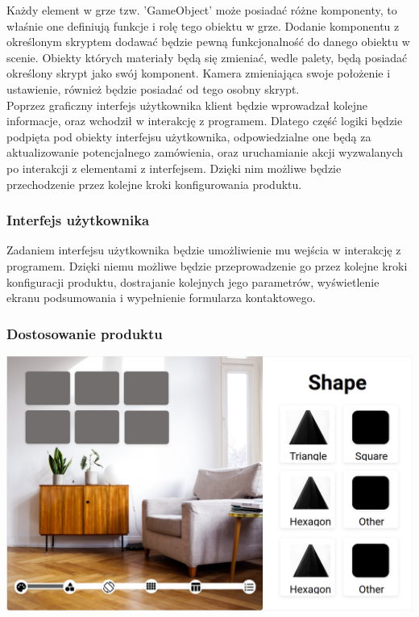\documentclass{article} %
\begin{document}
        Każdy element w grze tzw. 'GameObject' może posiadać różne komponenty, to właśnie one definiują funkcje i rolę tego obiektu w grze. Dodanie komponentu z określonym skryptem dodawać będzie pewną funkcjonalność do danego obiektu w scenie. Obiekty których materiały będą się zmieniać, wedle palety, będą posiadać określony skrypt jako swój komponent. Kamera zmieniająca swoje położenie i ustawienie, również będzie posiadać od tego osobny skrypt.
        \\
 
        Poprzez graficzny interfejs użytkownika klient będzie wprowadzał kolejne informacje, oraz wchodził w interakcję z programem. Dlatego część logiki będzie podpięta pod obiekty interfejsu użytkownika, odpowiedzialne one będą za aktualizowanie potencjalnego zamówienia, oraz uruchamianie akcji wyzwalanych po interakcji z elementami z interfejsem. Dzięki nim możliwe będzie przechodzenie przez kolejne kroki konfigurowania produktu.
        \\
        
        \subsubsection{Interfejs użytkownika}
        Zadaniem interfejsu użytkownika będzie umożliwienie mu wejścia w interakcję z programem. Dzięki niemu możliwe będzie przeprowadzenie go przez kolejne kroki konfiguracji produktu, dostrajanie kolejnych jego parametrów, wyświetlenie ekranu podsumowania i wypełnienie formularza kontaktowego.
        \\
        
        
        \subsubsection*{Dostosowanie produktu}
        
        \begin{center}
        \includegraphics[scale=0.3,keepaspectratio=true]{images/diagrams/ui_mockup.png}
        \end{center}
        
\end{document}
